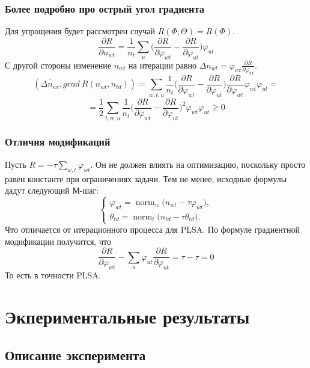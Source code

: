\documentclass[utf8]{beamer}
\DeclareMathOperator{\norm}{norm}
\renewcommand{\geq}{\geqslant}
\renewcommand{\phi}{\varphi}
\begin{document}
\begin{frame}
\frametitle{Более подробно про острый угол градиента}

Для упрощения будет рассмотрен случай $R(\Phi, \Theta) = R(\Phi)$.
\[
\frac{\partial{R}}{\partial{n_{wt}}}  = \frac{1}{n_t} \sum_{u} \bigg(\frac{\partial{R}}{\partial{\phi_{wt}}}  -  \frac{\partial{R}}{\partial{\phi_{ut}}} \bigg)  \phi_{ut}
\]
С другой стороны изменение $n_{wt}$ на итерации равно $ \Delta n_{wt} =  \phi_{wt} \frac{\partial{R}}{\partial{\phi_{wt}}}$.
\[
(\overline{\Delta n_{wt}}, grad\ R(n_{wt}, n_{td})) = \sum\limits_{w, t, u}  \frac{1}{n_{t}}  \bigg(  \frac{\partial{R}}{\partial{\phi_{wt}}}  -  \frac{\partial{R}}{\partial{\phi_{ut}}}  \bigg)  \frac{\partial{R}}{\partial{\phi_{wt}}} \phi_{wt} \phi_{ut}  = 
\]
\[
= \frac12  \sum\limits_{t, w, u}  \frac{1}{n_{t}} \bigg(  \frac{\partial{R}}{\partial{\phi_{wt}}}  -  \frac{\partial{R}}{\partial{\phi_{ut}}}  \bigg)^2 \phi_{wt} \phi_{ut}  \geq 0
\]
\end{frame}


\begin{frame}
\frametitle{Отличия модификаций}

Пусть $R = -\tau \sum_{w, t} \phi_{wt}$. Он не должен влиять на оптимизацию, поскольку просто равен константе при ограничениях задачи. Тем не менее, исходные формулы дадут следующий М-шаг:
\[
\left\{
	\begin{aligned}
		\phi_{wt} = \norm_w \big( n_{wt} - \tau \phi_{wt}\big),\\
		\theta_{td} = \norm_t \big( n_{td} - \tau \theta_{td}\big).
	\end{aligned}
\right.
\]
Что отличается от итерационного процесса для  PLSA. По формуле градиентной модификации получится, что 
\[
\frac{\partial{R}}{\partial{\phi_{wt}}} - \sum\limits_u \phi_{ut} \frac{\partial{R}}{\partial{\phi_{ut}}} = \tau - \tau =0
\]
То есть в точности PLSA.
\end{frame}


\section{Экпериментальные результаты}
\subsection{Описание эксперимента}
	
\end{document}

